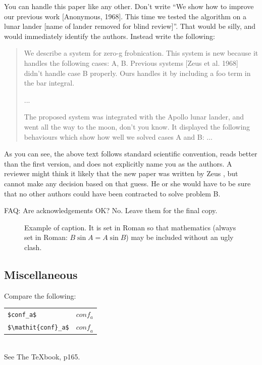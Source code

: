 \documentclass[10pt,twocolumn,letterpaper]{article}
\begin{document}
You can handle this paper like any other.  Don't write ``We show how
to improve our previous work [Anonymous, 1968].  This time we tested
the algorithm on a lunar lander [name of lander removed for blind
review]''.  That would be silly, and would immediately identify the
authors. Instead write the following:
\begin{quotation}
  \noindent
  We describe a system for zero-g frobnication.  This system is new
  because it handles the following cases: A, B.  Previous systems
  [Zeus et al. 1968] didn't handle case B properly.  Ours handles it
  by including a foo term in the bar integral.

  ...

  The proposed system was integrated with the Apollo lunar lander, and
  went all the way to the moon, don't you know.  It displayed the
  following behaviours which show how well we solved cases A and B:
  ...
\end{quotation}
As you can see, the above text follows standard scientific convention,
reads better than the first version, and does not explicitly name you
as the authors.  A reviewer might think it likely that the new paper
was written by Zeus \etal, but cannot make any decision based on that
guess.  He or she would have to be sure that no other authors could
have been contracted to solve problem B.

FAQ: Are acknowledgements OK?  No.  Leave them for the final copy.


\begin{figure}[t]
  \begin{center}
    \fbox{\rule{0pt}{2in} \rule{0.9\linewidth}{0pt}}
  \end{center}
  \caption{Example of caption.  It is set in Roman so that mathematics
    (always set in Roman: $B \sin A = A \sin B$) may be included
    without an ugly clash.}
  \label{fig:long}
  \label{fig:onecol}
\end{figure}

\subsection{Miscellaneous}

\noindent
Compare the following:\\
\begin{tabular}{ll}
  \verb'$conf_a$' &  $conf_a$ \\
  \verb'$\mathit{conf}_a$' & $\mathit{conf}_a$
\end{tabular}\\
See The \TeX book, p165.
\end{document}
